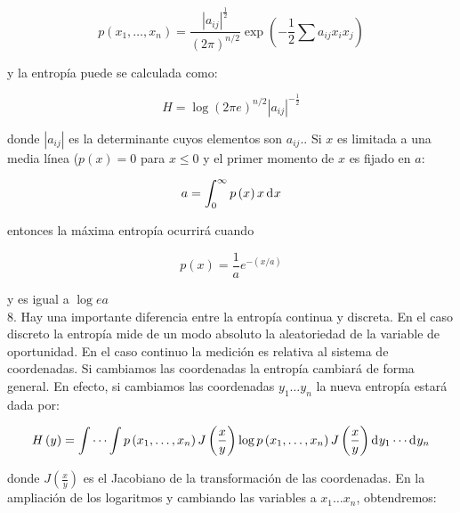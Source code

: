 \begin{equation}
p\left ( x_{1}, \ldots ,x_{n} \right )=\frac{\left | a_{ij} \right |^{\frac{1}{2}}}{\left ( 2\pi  \right )^{n/2}}\exp \left ( -\frac{1}{2} \sum a_{ij}x_{i}x_{j} \right)
\end{equation}

y la entrop\'ia puede se calculada como:

\begin{equation}
H=\log \left ( 2\pi e \right )^{n/2}\left | a_{ij} \right |^{-\frac{1}{2}}
\end{equation}

donde $\left |a_{ij}  \right | $ es la determinante cuyos elementos son $a_{ij}$.\newline {}. Si $x$ es limitada a una media l\'inea ($p\left ( x \right )=0$ para $x\leq0$ y el primer momento de $x$ es fijado en $a$:

\begin{equation}
a=\int_{0}^{\infty}p\left ( x \right )x \diff x 
\end{equation}

entonces la m\'axima entrop\'ia ocurrir\'a cuando

\begin{equation}
p\left ( x \right )=\frac{1}{a}e^{-\left ( x/a \right )}
\end{equation}

y es igual a $\log ea$
\\

8. Hay una importante diferencia entre la entrop\'ia continua y discreta. En el caso discreto la entrop\'ia mide de un modo absoluto la aleatoriedad de la variable de oportunidad. En el caso continuo la medici\'on es relativa al sistema de coordenadas. Si cambiamos las coordenadas la entrop\'ia cambiar\'a de forma general. En efecto, si cambiamos las coordenadas $y_{1} \dots y_{n}$ la nueva entrop\'ia estar\'a dada por:

\begin{equation}
H\left ( y \right )=\int \cdots \int p\left ( x_{1}, \ldots ,x_{n} \right )J\left ( \frac{x}{y} \right )\log p\left ( x_{1}, \ldots ,x_{n} \right )J\left ( \frac{x}{y} \right ) \diff y _{1}\cdots  \diff y _{n}
\end{equation}

donde $J\left ( \frac{x}{y} \right )$ es el Jacobiano de la transformaci\'on de las coordenadas. En la ampliaci\'on de los logaritmos y cambiando las variables a $x_{1}\dots x_{n}$, obtendremos:

